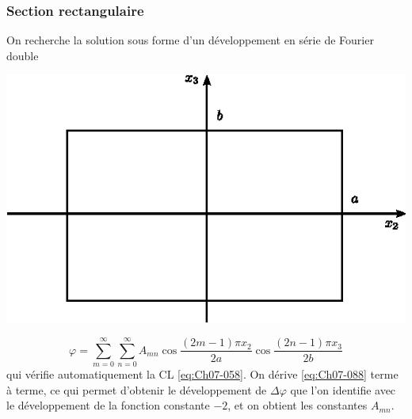 \subsubsection{Section rectangulaire}
\begin{multicols}{2}
    On recherche la solution sous forme d'un développement en série de Fourier double 
    \columnbreak
    \begin{center}
        \includegraphics{../images/T1_Ch07-17}
    \end{center}
\end{multicols}
\begin{equation}
    \varphi = \sum_{m=0}^{\infty} \sum_{n=0}^{\infty} A_{mn} \cos \frac{(2m-1)\pi x_2}{2a} \cos \frac{(2n-1)\pi x_3}{2b}
    \label{eq:Ch07-088}
\end{equation}
qui vérifie automatiquement la CL \eqref{eq:Ch07-058}.
On dérive \eqref{eq:Ch07-088} terme à terme, ce qui permet  d'obtenir le développement de $\Delta\varphi$ que l'on identifie  avec le développement de la fonction constante $-2$, et  on  obtient les  constantes $A_{mn}$.

